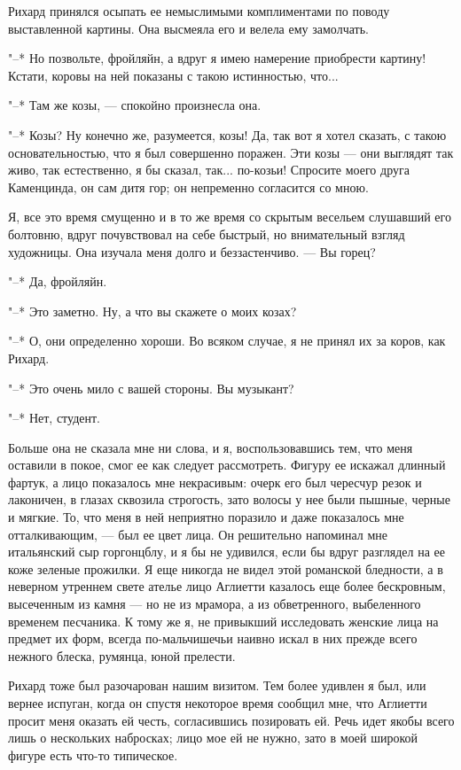 Рихард  принялся  осыпать  ее   немыслимыми  комплиментами  по  поводу
выставленной картины. Она высмеяла его и велела ему замолчать.

"--*  Но позвольте,  фройляйн,  а вдруг  я  имею намерение  приобрести
картину! Кстати, коровы на ней показаны с такою истинностью, что...

"--* Там же козы, --- спокойно произнесла она.

"--*  Козы? Ну  конечно  же, разумеется,  козы! Да,  так  вот я  хотел
сказать, с такою  основательностью, что я был  совершенно поражен. Эти
козы --- они  выглядят так живо, так естественно, я  бы сказал, так...
по-козьи!  Спросите  моего  друга  Каменцинда, он  сам  дитя  гор;  он
непременно согласится со мною.

Я,  все  это время  смущенно  и  в то  же  время  со скрытым  весельем
слушавший  его  болтовню,  вдруг  почувствовал  на  себе  быстрый,  но
внимательный взгляд художницы. Она изучала меня долго и беззастенчиво.
--- Вы горец?

"--* Да, фройляйн.

"--* Это заметно. Ну, а что вы скажете о моих козах?

"--* О,  они определенно хороши. Во  всяком случае, я не  принял их за
коров, как Рихард.

"--* Это очень мило с вашей стороны. Вы музыкант?

"--* Нет, студент.

Больше она  не сказала мне  ни слова,  и я, воспользовавшись  тем, что
меня  оставили в  покое, смог  ее как  следует рассмотреть.  Фигуру ее
искажал длинный  фартук, а лицо  показалось мне некрасивым:  очерк его
был  чересчур резок  и лаконичен,  в глазах  сквозила строгость,  зато
волосы  у  нее были  пышные,  черные  и мягкие.  То,  что  меня в  ней
неприятно поразило  и даже  показалось мне  отталкивающим, ---  был ее
цвет лица. Он решительно напоминал мне итальянский сыр горгонцблу, и я
бы не удивился, если бы вдруг разглядел на ее коже зеленые прожилки. Я
еще никогда не  видел этой романской бледности, а  в неверном утреннем
свете ателье  лицо Аглиетти казалось еще  более бескровным, высеченным
из камня --- но не из мрамора, а из обветренного, выбеленного временем
песчаника.  К тому  же я,  не  привыкший исследовать  женские лица  на
предмет их форм, всегда по-мальчишечьи наивно искал в них прежде всего
нежного блеска, румянца, юной прелести.

Рихард тоже  был разочарован нашим  визитом. Тем более удивлен  я был,
или вернее испуган,  когда он спустя некоторое время  сообщил мне, что
Аглиетти  просит меня  оказать ей  честь, согласившись  позировать ей.
Речь идет  якобы всего  лишь о  нескольких набросках;  лицо мое  ей не
нужно, зато в моей широкой фигуре есть что-то типическое.

